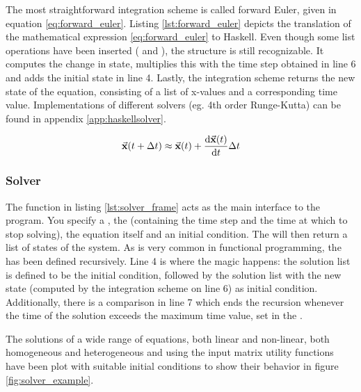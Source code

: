 The most straightforward integration scheme is called forward Euler, given in equation \ref{eq:forward_euler}. Listing \ref{lst:forward_euler} depicts the translation of the mathematical expression \ref{eq:forward_euler} to Haskell. Even though some list operations have been inserted ( and ), the structure is still recognizable. It computes the change in state, multiplies this with the time step obtained in line 6 and adds the initial state in line 4. Lastly, the integration scheme returns the new state of the equation, consisting of a list of x-values and a corresponding time value. Implementations of different solvers (eg. 4th order Runge-Kutta) can be found in appendix \ref{app:haskellsolver}.



\begin{equation}
\label{eq:forward_euler}
\vec{\mathbf{x}}(t + \Delta t) \approx \vec{\mathbf{x}}(t) + \frac{\mathrm d \vec{\mathbf{x}}(t)}{\mathrm d t}\Delta t
\end{equation}

\subsubsection{Solver}
The  function in listing \ref{lst:solver_frame} acts as the main interface to the program. You specify a , the  (containing the time step and the time at which to stop solving), the equation itself and an initial condition. The  will then return a list of states of the system. As is very common in functional programming, the  has been defined recursively. Line 4 is where the magic happens: the solution list is defined to be the initial condition, followed by the solution list with the new state (computed by the integration scheme on line 6) as initial condition. Additionally, there is a comparison in line 7 which ends the recursion whenever the time of the solution exceeds the maximum time value, set in the .

The solutions of a wide range of equations, both linear and non-linear, both homogeneous and heterogeneous and using the input matrix utility functions have been plot with suitable initial conditions to show their behavior in figure \ref{fig:solver_example}.



